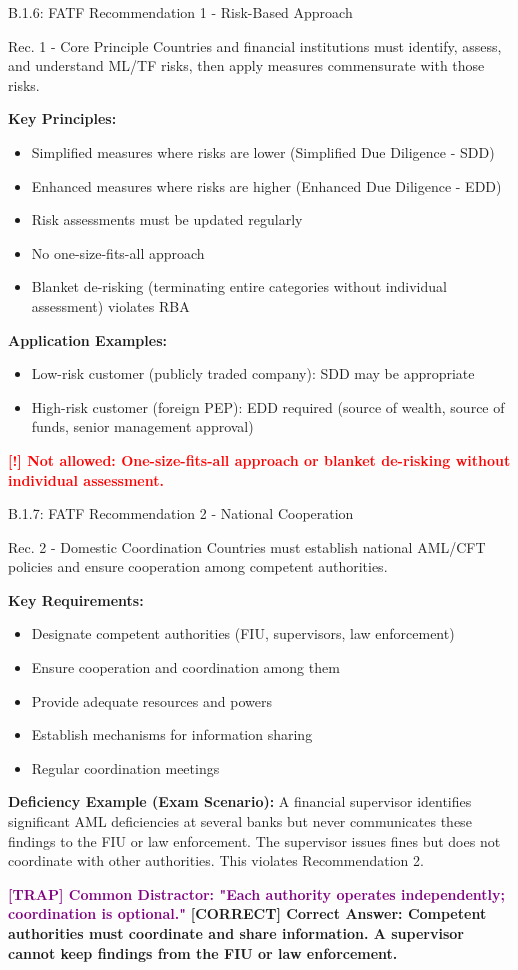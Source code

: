 \documentclass[11pt,a4paper]{beamer}
\newcommand{\redflag}[1]{\textcolor{red}{\textbf{[!] #1}}}
\newcommand{\trap}[1]{\textcolor{purple}{\textbf{[TRAP] #1}}}
\newcommand{\correct}[1]{\textcolor{green!50!black}{\textbf{[CORRECT] #1}}}
\begin{document}
	\begin{frame}{B.1.6: FATF Recommendation 1 - Risk-Based Approach}
		\begin{block}{Rec. 1 - Core Principle}
			Countries and financial institutions must identify, assess, and understand ML/TF risks, then apply measures commensurate with those risks.
		\end{block}
		\textbf{Key Principles:}
		\begin{itemize}
			\item Simplified measures where risks are lower (Simplified Due Diligence - SDD)
			\item Enhanced measures where risks are higher (Enhanced Due Diligence - EDD)
			\item Risk assessments must be updated regularly
			\item No one-size-fits-all approach
			\item Blanket de-risking (terminating entire categories without individual assessment) violates RBA
		\end{itemize}
		\textbf{Application Examples:}
		\begin{itemize}
			\item Low-risk customer (publicly traded company): SDD may be appropriate
			\item High-risk customer (foreign PEP): EDD required (source of wealth, source of funds, senior management approval)
		\end{itemize}
		\redflag{Not allowed: One-size-fits-all approach or blanket de-risking without individual assessment.}
	\end{frame}
	
	\begin{frame}{B.1.7: FATF Recommendation 2 - National Cooperation}
		\begin{block}{Rec. 2 - Domestic Coordination}
			Countries must establish national AML/CFT policies and ensure cooperation among competent authorities.
		\end{block}
		\textbf{Key Requirements:}
		\begin{itemize}
			\item Designate competent authorities (FIU, supervisors, law enforcement)
			\item Ensure cooperation and coordination among them
			\item Provide adequate resources and powers
			\item Establish mechanisms for information sharing
			\item Regular coordination meetings
		\end{itemize}
		\textbf{Deficiency Example (Exam Scenario):}
		A financial supervisor identifies significant AML deficiencies at several banks but never communicates these findings to the FIU or law enforcement. The supervisor issues fines but does not coordinate with other authorities. This violates Recommendation 2.
		
		\trap{Common Distractor: "Each authority operates independently; coordination is optional."}
		\correct{Correct Answer: Competent authorities must coordinate and share information. A supervisor cannot keep findings from the FIU or law enforcement.}
	\end{frame}
	
\end{document}
